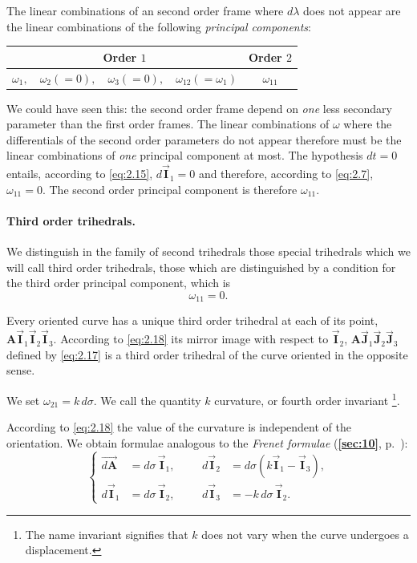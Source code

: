 \documentclass[leqno,11pt]{book}
\numberwithin{equation}{chapter}
\theoremstyle{shape1}
\theoremstyle{shapesmall}
\newcommand{\fsref}[1]{{\rm\textsection\textbf{\ref{sec:#1}}}}
\newcommand{\rvec}[1]{\vec{\mathbf{#1}}}
\newcommand{\ivec}{\rvec{I}}
\newcommand{\jvec}{\rvec{J}}
\begin{document}
The linear combinations of an second order frame where $d\lambda$ does not appear are the linear combinations of the following \emph{principal components}:
\begin{center}  
\begin{tabular}{|c|c|}
  \hline
  Order $1$&Order $2$\\
  \hline
  $\omega_{1},\quad\omega_{2}(=0),\quad\omega_{3}(=0),\quad\omega_{12}(=\omega_{1})$&$\omega_{11}$\\
  \hline
\end{tabular}
\end{center}

We could have seen this: the second order frame depend on \emph{one} less secondary parameter than the first order frames. The linear combinations of $\omega$ where the differentials of the second order parameters do not appear therefore must be the linear combinations of \emph{one} principal component at most. The hypothesis $dt=0$ entails, according to \eqref{eq:2.15}, $d\ivec_{1}=0$ and therefore, according to \eqref{eq:2.7}, $\omega_{11}=0$. The second order principal component is therefore $\omega_{11}$.

\paragraph{Third order trihedrals.}
\label{sec:29}
We distinguish in the family of second trihedrals those special trihedrals which we will call third order trihedrals, those which are distinguished by a condition for the third order principal component, which is
\begin{equation}
  \label{eq:2.19}
  \omega_{11}=0.
\end{equation}

Every oriented curve has a unique third order trihedral at each of its point, $\mathbf{A}\ivec_{1}\ivec_{2}\ivec_{3}$. According to \eqref{eq:2.18} its mirror image with respect to $\ivec_{2}$, $\mathbf{A}\jvec_{1}\jvec_{2}\jvec_{3}$ defined by \eqref{eq:2.17} is a third order trihedral of the curve oriented in the opposite sense.

We set $\omega_{21}=k\,d\sigma$. We call the quantity $k$ curvature, or fourth order invariant \footnote{The name invariant signifies that $k$ does not vary when the curve undergoes a displacement.}.

According to \eqref{eq:2.18} the value of the curvature is independent of the orientation. We obtain formulae analogous to the \emph{Frenet formulae} (\fsref{10}, p.~\pageref{sec:10}):
\begin{equation}
  \label{eq:2.20}
  \left\{
    \begin{aligned}
      \overrightarrow{d\mathbf{A}}&=d\sigma\,\ivec_{1},&&&d\ivec_{2}&=d\sigma(k\ivec_{1}-\ivec_{3}),\\
      d\ivec_{1}&=d\sigma\,\ivec_{2},&&&d\ivec_{3}&=-k\,d\sigma\,\ivec_{2}.
    \end{aligned}
  \right.
\end{equation}
\end{document}
